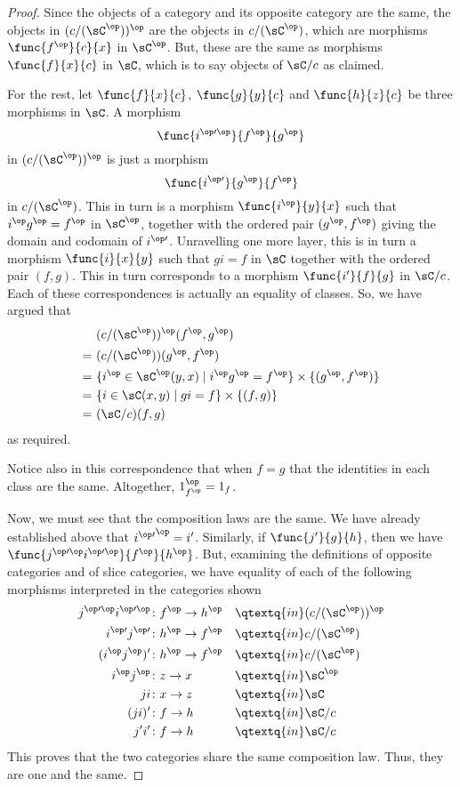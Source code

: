 \documentclass[main.tex]{subfiles}
\begin{document}
\begin{proof}
	Since the objects of a category and its opposite category are the same, the
	objects in \((c/(\sC^\op))^\op\) are the objects in \(c/(\sC^\op)\), which
	are morphisms \(\func{f^\op}{c}{x}\) in \(\sC^\op\). But, these are the same
	as morphisms \(\func{f}{x}{c}\) in \(\sC\), which is to say objects of
	\(\sC/c\) as claimed.

	For the rest, let \(\func{f}{x}{c}\), \(\func{g}{y}{c}\) and
	\(\func{h}{z}{c}\) be three morphisms in \(\sC\). A morphism
	\[\func{i^{\op\prime\op}}{f^\op}{g^\op}\] in \((c/(\sC^\op))^\op\) is just a
	morphism \[\func{i^{\op\prime}}{g^\op}{f^\op}\] in \(c/(\sC^\op)\). This in
	turn is a morphism \(\func{i^\op}{y}{x}\) such that \(i^\op g^\op=f^\op\) in
	\(\sC^\op\), together with the ordered pair \((g^\op,f^\op)\) giving the
	domain and codomain of \(i^{\op\prime}\). Unravelling one more layer, this
	is in turn a morphism \(\func{i}{x}{y}\) such that \(gi=f\) in \(\sC\)
	together with the ordered pair \((f,g)\). This in turn corresponds to a
	morphism \(\func{i'}{f}{g}\) in \(\sC/c\). Each of these correspondences is
	actually an equality of classes. So, we have argued that
	\begin{align*}
		&(c/(\sC^\op))^\op(f^\op, g^\op)\\
		=\ &(c/(\sC^\op))(g^\op, f^\op)\\
		=\ &\{i^\op\in\sC^\op(y,x)\mid i^\op g^\op=f^\op\}\times\{(g^\op,f^\op)\}\\
		=\ &\{i\in\sC(x,y)\mid gi=f\}\times\{(f,g)\}\\
		=\ &(\sC/c)(f,g)\\
	\end{align*}
		as required.

	Notice also in this correspondence that when \(f=g\) that the identities in
	each class are the same. Altogether, \(1_{f^\op}^\op=1_f\).

	Now, we must see that the composition laws are the same. We have already
	established above that \({i^{\op\prime}}^\op=i'\). Similarly, if
	\(\func{j'}{g}{h}\), then we have
	\(\func{j^{\op\prime\op}i^{\op\prime\op}}{f^\op}{h^\op}\). But, examining
	the definitions of opposite categories and of slice categories, we have
	equality of each of the following morphisms interpreted in the categories
	shown
	\begin{alignat*}{2}
		j^{\op\prime\op}i^{\op\prime\op}\colon&f^\op\to h^\op&&
		\qtextq{ in }(c/(\sC^\op))^\op\\
		i^{\op\prime}j^{\op\prime}\colon&h^\op\to f^\op&&
		\qtextq{ in }c/(\sC^\op)\\
		(i^\op j^\op)'\colon&h^\op\to f^\op&&
		\qtextq{ in }c/(\sC^\op)\\
		i^\op j^\op\colon&z\to x&&\qtextq{ in }\sC^\op\\
		ji\colon&x\to z&&\qtextq{ in }\sC\\
		(ji)'\colon&f\to h&&\qtextq{ in }\sC/c\\
		j' i'\colon&f\to h&&\qtextq{ in }\sC/c
	\end{alignat*} This proves that the two
	categories share the same composition law. Thus, they are one and the same.


\end{proof}
\end{document}
